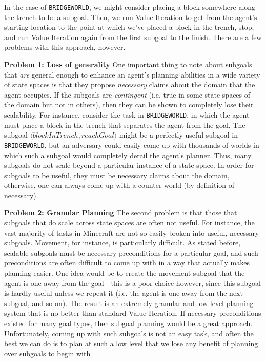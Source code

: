 \documentclass[]{article}
\begin{document}
In the case of \texttt{BRIDGEWORLD}, we might consider placing 
a block somewhere along the trench to be a subgoal. Then, we 
run Value Iteration to get from the agent's starting location to the 
point at which we've placed a block in the trench, stop, and run 
Value Iteration again from the first subgoal to the finish. There are 
a few problems with this approach, however.


{\bf Problem 1: Loss of generality}  One important thing to note about subgoals 
that {\it are} general enough to enhance an agent's planning abilities in a wide 
variety of state spaces is that they propose {\it necessary} claims about the 
domain that the agent occupies. If the subgoals are {\it contingent} (i.e. true in 
some state spaces of the domain but not in others), then they can be shown to 
completely lose their scalability. For instance, consider the task in \texttt{BRIDGEWORLD}, 
in which the agent must place a block in the trench that separates the agent from the goal. 
The subgoal $\langle blockInTrench, reachGoal\rangle$ might be a perfectly useful 
subgoal in \texttt{BRIDGEWORLD}, but an adversary could easily come up with 
thousands of worlds in which such a subgoal would completely derail the agent's 
planner. Thus, many subgoals do not scale beyond a particular instance of a state 
space. In order for subgoals to be useful, they must be necessary claims about the 
domain, otherwise, one can always come up with a counter world (by definition of necessary). 

{\bf Problem 2: Granular Planning} The second problem is that those that subgoals 
that do scale across state spaces are often not useful. For instance, the vast majority 
of tasks in Minecraft are not so easily broken into useful, necessary subgoals. 
Movement, for instance, is particularly difficult. As stated before, scalable subgoals 
must be necessary preconditions for a particular goal, and such preconditions are 
often difficult to come up with in a way that actually makes planning easier. One 
idea would be to create the movement subgoal that the agent is one away from 
the goal - this is a poor choice however, since this subgoal is hardly useful unless 
we repeat it (i.e. the agent is one away from the next subgoal, and so on). The 
result is an extremely granular and low level planning system that is no better 
than standard Value Iteration. If necessary preconditions existed for many goal 
types, then subgoal planning would be a great approach. Unfortunately, coming 
up with such subgoals is not an easy task, and often the best we can do is to 
plan at such a low level that we lose any benefit of planning over subgoals to begin with
\end{document}
